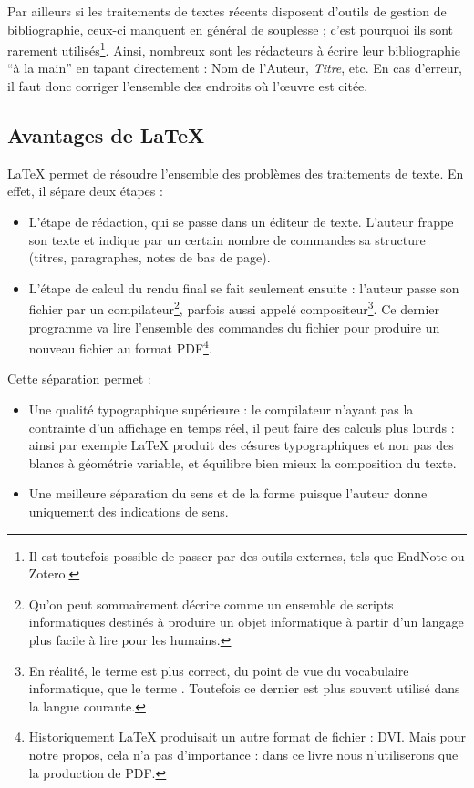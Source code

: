 Par ailleurs si les traitements de textes récents disposent d'outils de gestion de bibliographie, ceux-ci manquent en général de souplesse ; c'est pourquoi ils sont rarement utilisés\footnote{Il est toutefois possible de passer par des outils externes, tels que EndNote ou Zotero.}. Ainsi, nombreux sont les rédacteurs à écrire  leur bibliographie \enquote{à la main} en tapant directement : Nom de l'Auteur, \emph{Titre}, etc. En cas d'erreur, il faut donc corriger l'ensemble des endroits où l'œuvre est citée.

\subsection{Avantages de \LaTeX{}}

\LaTeX{} permet de résoudre l'ensemble des problèmes des traitements de texte. En effet, il sépare deux étapes : 

\begin{itemize}
\item L'étape de rédaction, qui se passe dans un éditeur de texte. L'auteur frappe son texte et indique par un certain nombre de commandes sa structure (titres, paragraphes, notes de bas de page).
\item L'étape de calcul du rendu final se fait seulement  ensuite : l'auteur  passe son fichier par un compilateur\footnote{Qu'on peut sommairement décrire comme un ensemble de scripts informatiques destinés à produire un objet informatique à partir d'un langage plus facile à lire pour les humains.}, parfois aussi appelé compositeur\footnote{En réalité, le terme  est plus correct, du point de vue du vocabulaire informatique, que le terme . Toutefois ce dernier est plus souvent utilisé dans la langue courante.}. Ce dernier programme va lire l'ensemble des commandes du fichier pour produire un nouveau fichier au format PDF\footnote{Historiquement \LaTeX{} produisait un autre format de fichier : DVI. Mais pour notre propos, cela n'a pas d'importance : dans ce livre nous n'utiliserons que la production de PDF.}.
\end{itemize}

Cette séparation permet :
\begin{itemize}
\item Une qualité typographique supérieure :  le compilateur n'ayant pas la contrainte d'un affichage en temps réel, il peut faire des calculs plus lourds : ainsi par exemple \LaTeX{} produit des césures typographiques et non pas des blancs à géométrie variable, et équilibre bien mieux la composition du texte.
\item Une meilleure séparation du sens et de la forme puisque l'auteur donne uniquement des indications de sens.
\end{itemize}


